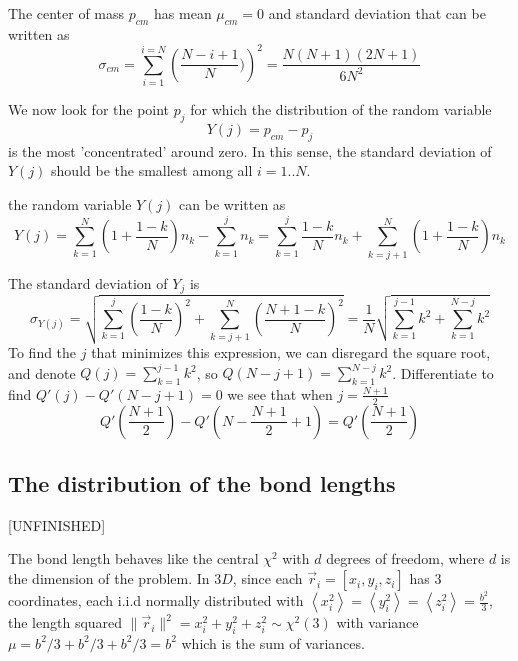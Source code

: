 \documentclass{report}
\begin{document}
The center of mass $p_{cm}$ has mean $\mu_{cm}=0$ and standard deviation that can be written as
\begin{equation*}
\sigma_{cm}=\sum_{i=1}^{i=N}\left( \frac{N-i+1}{N}) \right)^2 = \frac{N(N+1)(2N+1)}{6N^2}
\end{equation*}

We now look for the point $p_j$ for which the distribution of the random variable 
\begin{equation*}
Y(j)=p_{cm}-p_j
\end{equation*}
is the most 'concentrated' around zero. 
In this sense, the standard deviation of $Y(j)$ should be the smallest among all $i=1..N$.

the random variable $Y(j)$ can be written as
\begin{equation*}
Y(j) = \sum_{k=1}^{N}\left(1+\frac{1-k}{N}\right)n_k -\sum_{k=1}^{j}n_k = \sum_{k=1}^{j}\frac{1-k}{N}n_k +\sum_{k=j+1}^{N}(1+\frac{1-k}{N})n_k
\end{equation*}

The standard deviation of $Y_j$ is
\begin{equation*}
\sigma_{Y(j)}=\sqrt{\sum_{k=1}^{j}\left(\frac{1-k}{N}\right)^2+\sum_{k=j+1}^{N}\left(\frac{N+1-k}{N} \right)^2}=\frac{1}{N}\sqrt{\sum_{k=1}^{j-1}k^2+\sum_{k=1}^{N-j}k^2}
\end{equation*}
To find the $j$ that minimizes this expression, we can disregard the square root, and denote $Q(j)=\sum_{k=1}^{j-1}k^2$, so $Q(N-j+1)=\sum_{k=1}^{N-j}k^2$. Differentiate to find $Q'(j)-Q'(N-j+1)=0$  we see that when $j= \frac{N+1}{2}$\\
\begin{equation*}
Q'(\frac{N+1}{2})-Q'(N-\frac{N+1}{2}+1)=Q'(\frac{N+1}{2})
\end{equation*} 




\subsection{The distribution of the bond lengths}\label{subsection_distributionOfTheBondLength}
[UNFINISHED] 

The bond length behaves like the central $\chi ^2$ with $d$ degrees of freedom, where $d$ is the dimension of the problem. 
In $3D$, since each $\vec{r}_i=[x_i,y_i,z_i]$ has 3 coordinates, each i.i.d normally distributed with $\left<x_i^2\right>=\left<y_i^2\right>=\left<z_i^2\right>=\frac{b^2}{3}$, the length squared $\|\vec{r}_i\|^2=x_i^2+y_i^2+z_i^2\sim\chi^2(3)$ 
with variance $\mu=b^2/3+b^2/3+b^2/3=b^2$ which is the sum of variances.
\end{document}
